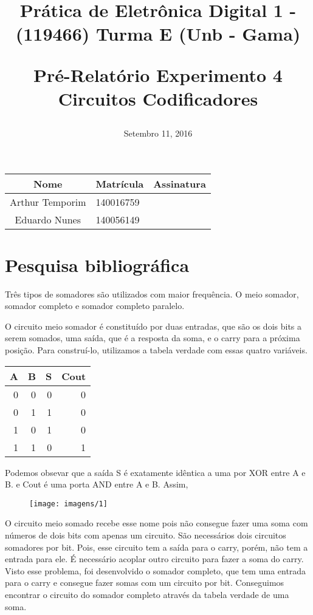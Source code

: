 \documentclass[12pts]{article}
\title{
	Prática de Eletrônica Digital 1 - (119466)
	\singlespacing
		Turma E (Unb - Gama)
	\singlespacing
	\begin{midpage}
	\begin {large}
		Pré-Relatório Experimento 4
		\singlespace
    Circuitos Codificadores
	\end {large}
	\end{midpage}
}
\date{Setembro 11, 2016}
\begin{document}
\maketitle	
\begin{center}

\begin{tabular}{|c|l|r|}
\hline
Nome & Matrícula & Assinatura\\
\hline
Arthur Temporim & 140016759 & \\
\hline	
Eduardo Nunes & 140056149 & \\
\hline	
\end{tabular}

\end{center}

\pagebreak

\section{Pesquisa bibliográfica}

Três tipos de somadores são utilizados com maior frequência. O meio somador, somador completo e somador completo paralelo.
	
O circuito meio somador é constituído por duas entradas, que são os dois bits a serem somados, uma saída, que é a resposta da soma, e o carry para a próxima posição. Para construí-lo, utilizamos a tabela verdade com essas quatro variáveis. 

\begin{center}
	\begin{tabular}{|r|r|r|r|}
		\hline
		A & B & S & Cout \\
		\hline
		0 & 0 & 0 & 0 \\				
		\hline
		0 & 1 & 1 & 0 \\
		\hline
		1 & 0 & 1 & 0 \\
		\hline
		1 & 1 & 0 & 1 \\
		\hline
	\end{tabular}
\end{center}

Podemos obsevar que a saída S é exatamente idêntica a uma por XOR entre A e B. e Cout é uma porta AND entre A e B. Assim, 

\begin{figure}[!htb]
  \centering
  \texttt{[image: imagens/1]}
  \label{figRotulo}
\end{figure}

O circuito meio somado recebe esse nome pois não consegue fazer uma soma com números de dois bits com apenas um circuito. São necessários dois circuitos somadores por bit.  Pois, esse circuito tem a saída para o carry, porém, não tem a entrada para ele. É necessário acoplar outro circuito para fazer a soma do carry. Visto esse problema, foi desenvolvido o somador completo, que tem uma entrada para o carry e consegue fazer somas com um circuito por bit. Conseguimos encontrar o circuito do somador completo através da tabela verdade de uma soma.
\end{document}
